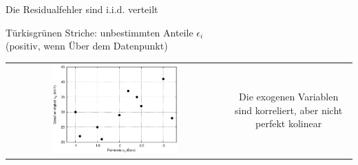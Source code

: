 \begin{landscape}
\begin{center}
\newpage

\vspace{-0em}
\vspace{-1em}

Die Residualfehler sind i.i.d. verteilt 


\newpage

\vspace{-1em}


T\"urkisgr\"unen Striche:  unbestimmten Anteile
$\epsilon_i$\\ (positiv, wenn \"Uber dem Datenpunkt)

\newpage
\vspace{0em}

\begin{tabular}{cc}
\includegraphics[width=0.6\textwidth]{figsRegr/scatterplot_x1x2.eps}
&
\parbox{0.4\textwidth}{\vspace{-10em}

Die 
exogenen Variablen sind korreliert, aber nicht perfekt kolinear}
\end{tabular}

\vspace{0em}


\end{center}
\end{landscape}
